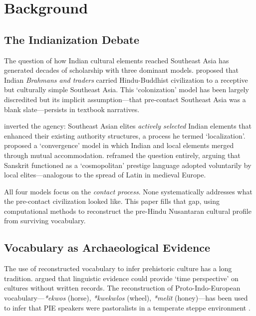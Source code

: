\documentclass[12pt,a4paper]{article}
\begin{document}
\section{Background}

\subsection{The Indianization Debate}

The question of how Indian cultural elements reached Southeast Asia has generated decades of scholarship with three dominant models. \citet{coedes1968} proposed that Indian \textit{Brahmans and traders} carried Hindu-Buddhist civilization to a receptive but culturally simple Southeast Asia. This `colonization' model has been largely discredited but its implicit assumption---that pre-contact Southeast Asia was a blank slate---persists in textbook narratives.

\citet{wolters1999} inverted the agency: Southeast Asian elites \textit{actively selected} Indian elements that enhanced their existing authority structures, a process he termed `localization'. \citet{kulke1990} proposed a `convergence' model in which Indian and local elements merged through mutual accommodation. \citet{pollock2006} reframed the question entirely, arguing that Sanskrit functioned as a `cosmopolitan' prestige language adopted voluntarily by local elites---analogous to the spread of Latin in medieval Europe.

All four models focus on the \textit{contact process}. None systematically addresses what the pre-contact civilization looked like. This paper fills that gap, using computational methods to reconstruct the pre-Hindu Nusantaran cultural profile from surviving vocabulary.

\subsection{Vocabulary as Archaeological Evidence}

The use of reconstructed vocabulary to infer prehistoric culture has a long tradition. \citet{sapir1916} argued that linguistic evidence could provide `time perspective' on cultures without written records. The reconstruction of Proto-Indo-European vocabulary---\textit{*ekwos} (horse), \textit{*kwekwlos} (wheel), \textit{*melit} (honey)---has been used to infer that PIE speakers were pastoralists in a temperate steppe environment \citep{mallory2006}.
\end{document}
